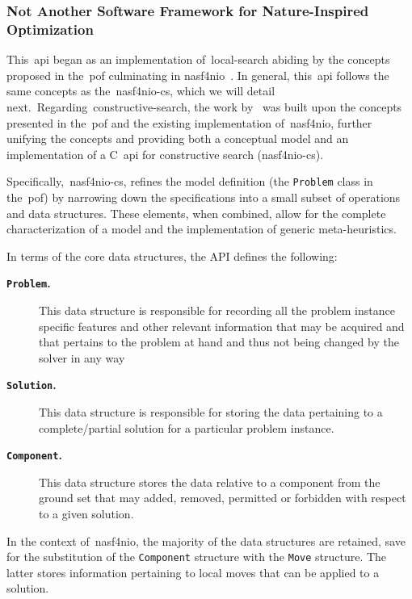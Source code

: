 \subsubsection*{Not Another Software Framework for Nature-Inspired Optimization}

This~\acrshort{api} began as an implementation of~\acrshort{local-search}
abiding by the concepts proposed in the~\acrshort{pof} culminating in
\acrshort{nasf4nio}~\cite{fonseca2021nasf4nio}. In general, this~\acrshort{api}
follows the same concepts as the~\acrshort{nasf4nio-cs}, which we will detail
next.~Regarding~\acrshort{constructive-search}, the work
by~\citet{outeiro2021application} was built upon the concepts presented in
the~\acrshort{pof} and the existing implementation of~\acrshort{nasf4nio},
further unifying the concepts and providing both a conceptual model and an
implementation of a C~\acrshort{api} for constructive search
(\acrshort{nasf4nio-cs}).

Specifically,~\acrshort{nasf4nio-cs}, refines the model definition (the
\texttt{Problem} class in the~\acrshort{pof}) by narrowing down the
specifications into a small subset of operations and data structures. These
elements, when combined, allow for the complete characterization of a model and
the implementation of generic meta-heuristics.

In terms of the core data structures, the API defines the following:

\begin{description}
  \item[\textbf{\texttt{Problem}.}] This data structure is responsible for recording
    all the problem instance specific features and other relevant information
    that may be acquired and that pertains to the problem at hand and thus not
    being changed by the solver in any way
  \item[\textbf{\texttt{Solution}.}] This data structure is responsible for storing the
    data pertaining to a complete/partial solution for a particular problem
    instance.
  \item[\textbf{\texttt{Component}.}] This data structure stores the data
    relative to a component from the ground set that may added, removed,
    permitted or forbidden with respect to a given solution.
\end{description}

In the context of~\acrshort{nasf4nio}, the majority of the data structures are
retained, save for the substitution of the \texttt{Component} structure with the
\texttt{Move} structure. The latter stores information pertaining to local moves
that can be applied to a solution.

